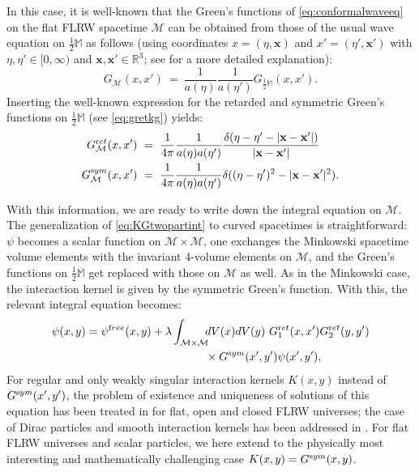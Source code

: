 \documentclass[b5paper,draft,openbib,12pt]{memoir}
\newcommand{\R}{\mathbb{R}}
\newcommand{\M}{\mathbb{M}}
\newcommand{\vx}{\mathbf{x}}
\newcommand{\ret}{{\textup ret}}
\newcommand{\sym}{{\textup sym}}
\newcommand{\free}{{\textup free}}
\begin{document}
In this case, it is well-known that the Green's 
functions of \eqref{eq:conformalwaveeq} on the flat 
FLRW spacetime $\mathcal{M}$ can be obtained from 
those of the usual wave equation on $\tfrac{1}{2}\M$ 
as follows (using coordinates $x=(\eta,\vx)$ and 
$x'=(\eta',\vx')$ with $\eta,\eta' \in [0,\infty)$ 
and $\vx,\vx' \in \R^3$; see \cite{lienertcurved} for 
a more detailed explanation):
\begin{equation}
	G_{\mathcal{M}}(x,x') ~=~ \frac{1}{a(\eta)} \frac{1}{a(\eta')} G_{\frac{1}{2}\M}(x,x').
\end{equation}
Inserting the well-known expression for the retarded 
and symmetric Green's functions on $\tfrac{1}{2}\M$ 
(see \eqref{eq:gretkg}) yields:
\begin{align}
	G_{\mathcal{M}}^\ret(x,x') ~&=~ \frac{1}{4\pi} \frac{1}{a(\eta) a(\eta')} \frac{\delta(\eta - \eta' -|\vx-\vx'|)}{|\vx-\vx'|}\nonumber\\
G_{\mathcal{M}}^\sym(x,x') ~&=~ \frac{1}{4\pi} \frac{1}{a(\eta) a(\eta')} \delta((\eta-\eta')^2-|\vx-\vx'|^2).
\end{align}

With this information, we are ready to write down 
the integral equation on $\mathcal{M}$. The 
generalization of \eqref{eq:KGtwopartint} to curved 
spacetimes is straightforward: $\psi$ becomes a 
scalar function on $\mathcal{M}\times\mathcal{M}$, 
one exchanges the Minkowski spacetime volume elements 
with the invariant 4-volume elements on $\mathcal{M}$, 
and the Green's functions on $\tfrac{1}{2}\M$ get 
replaced with those on $\mathcal{M}$ as well. As in 
the Minkowski case, the interaction kernel is given 
by the symmetric Green's function. With this, the 
relevant integral equation becomes:
\begin{align}\notag
\psi(x,y) = \psi^\free(x,y) 
+ \lambda \int_{\mathcal{M}\times \mathcal{M}} \!\!
&dV(x) dV(y)~G_1^\ret(x,x')G_2^\ret(y,y')\\
&\times  G^\sym(x',y') \psi(x',y'),
\label{eq:inteqcurved}
\end{align}
For regular and only weakly singular interaction 
kernels $K(x,y)$ instead of $G^\sym(x',y')$, the 
problem of existence and uniqueness of solutions of 
this equation has been treated in \cite{lienertcurved} 
for flat, open and closed FLRW universes; the case of 
Dirac particles and smooth interaction kernels has 
been addressed in \cite{selfDirac}. For flat FLRW 
universes and scalar particles, we here extend 
\cite{lienertcurved} to the physically most interesting 
and mathematically challenging case 
$K(x,y)=G^\sym(x,y)$.
\end{document}
